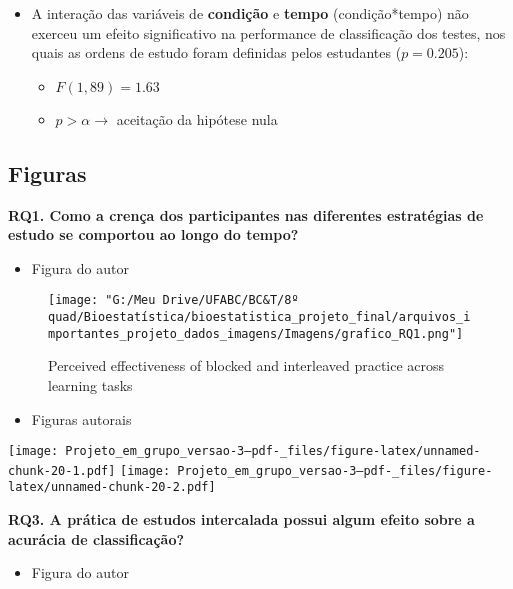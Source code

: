 \documentclass[
]{article}
\providecommand{\tightlist}{%
  \setlength{\itemsep}{0pt}\setlength{\parskip}{0pt}}
\begin{document}
\begin{itemize}
\item
  A interação das variáveis de \textbf{condição} e \textbf{tempo}
  (condição*tempo) não exerceu um efeito significativo na performance de
  classificação dos testes, nos quais as ordens de estudo foram
  definidas pelos estudantes (\(p = 0.205\)):

  \begin{itemize}
  \tightlist
  \item
    \(F(1, 89) = 1.63\)
  \item
    \(p > \alpha \rightarrow\) aceitação da hipótese nula
  \end{itemize}
\end{itemize}

\subsection{Figuras}\label{figuras}

\textbf{RQ1. Como a crença dos participantes nas diferentes estratégias
de estudo se comportou ao longo do tempo?}

\begin{itemize}
\tightlist
\item
  Figura do autor
\end{itemize}

\begin{figure}
\centering
\texttt{[image: "G:/Meu Drive/UFABC/BC\&T/8º quad/Bioestatística/bioestatistica\_projeto\_final/arquivos\_importantes\_projeto\_dados\_imagens/Imagens/grafico\_RQ1.png"]}
\caption{Perceived effectiveness of blocked and interleaved practice
across learning tasks}
\end{figure}

\begin{itemize}
\tightlist
\item
  Figuras autorais
\end{itemize}

\texttt{[image: Projeto\_em\_grupo\_versao-3--pdf-\_files/figure-latex/unnamed-chunk-20-1.pdf]}
\texttt{[image: Projeto\_em\_grupo\_versao-3--pdf-\_files/figure-latex/unnamed-chunk-20-2.pdf]}

\textbf{RQ3. A prática de estudos intercalada possui algum efeito sobre
a acurácia de classificação?}

\begin{itemize}
\tightlist
\item
  Figura do autor
\end{itemize}
\end{document}
